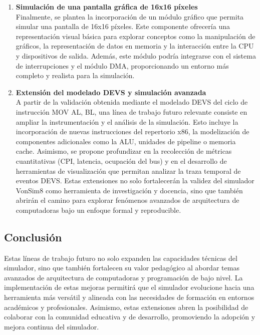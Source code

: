 \documentclass[12pt,oneside]{templates/unerthesis}
\begin{document}
\begin{enumerate}
\item
  \textbf{Simulación de una pantalla gráfica de 16x16 píxeles}\\
  Finalmente, se plantea la incorporación de un módulo gráfico que permita simular una pantalla de 16x16 píxeles. Este componente ofrecería una representación visual básica para explorar conceptos como la manipulación de gráficos, la representación de datos en memoria y la interacción entre la CPU y dispositivos de salida. Además, este módulo podría integrarse con el sistema de interrupciones y el módulo DMA, proporcionando un entorno más completo y realista para la simulación.
\item
  \textbf{Extensión del modelado DEVS y simulación avanzada}\\
  A partir de la validación obtenida mediante el modelado DEVS del ciclo de instrucción MOV AL, BL, una línea de trabajo futuro relevante consiste en ampliar la instrumentación y el análisis de la simulación. Esto incluye la incorporación de nuevas instrucciones del repertorio x86, la modelización de componentes adicionales como la ALU, unidades de pipeline o memoria cache. Asimismo, se propone profundizar en la recolección de métricas cuantitativas (CPI, latencia, ocupación del bus) y en el desarrollo de herramientas de visualización que permitan analizar la traza temporal de eventos DEVS. Estas extensiones no solo fortalecerán la validez del simulador VonSim8 como herramienta de investigación y docencia, sino que también abrirán el camino para explorar fenómenos avanzados de arquitectura de computadoras bajo un enfoque formal y reproducible.
\end{enumerate}

\hypertarget{conclusiuxf3n-1}{%
\subsection{Conclusión}\label{conclusiuxf3n-1}}

Estas líneas de trabajo futuro no solo expanden las capacidades técnicas del simulador, sino que también fortalecen su valor pedagógico al abordar temas avanzados de arquitectura de computadoras y programación de bajo nivel. La implementación de estas mejoras permitirá que el simulador evolucione hacia una herramienta más versátil y alineada con las necesidades de formación en entornos académicos y profesionales. Asimismo, estas extensiones abren la posibilidad de colaborar con la comunidad educativa y de desarrollo, promoviendo la adopción y mejora continua del simulador.
\end{document}
